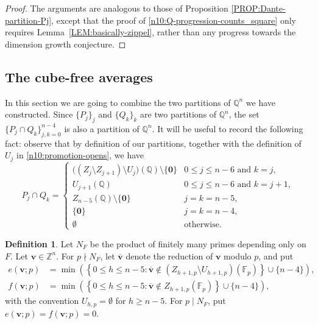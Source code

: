 \documentclass[a4paper,11pt, twoside,reqno]{amsart}
\theoremstyle{plain}
\theoremstyle{definition}
\newtheorem{defin}[thm]{Definition}
\theoremstyle{remark}
\newcommand{\bfv}{\bm{v}}
\newcommand{\ZZ}{\mathbb{Z}}
\newcommand{\QQ}{\mathbb{Q}}
\renewcommand{\bar}{\overline}
\renewcommand{\le}{\leqslant}
\renewcommand{\ge}{\geqslant}
\newcommand{\FF}{\mathbb{F}}
\numberwithin{equation}{section}
\begin{document}
\begin{proof}
The arguments are analogous to those  of Proposition \ref{PROP:Dante-partition-Pj},
except that the proof of \eqref{n10:Q-progression-counts_square} only requires
Lemma~\ref{LEM:basically-zippel}, rather than 
any progress towards the dimension growth conjecture.
\end{proof}

\subsection{The cube-free averages}\label{sec:silver}

In this section we are going to combine the two partitions of $\QQ^n$ we have constructed.
Since $\{P_j\}_j$ and $\{Q_k\}_k$
are two partitions of $\QQ^n$,
the set $\{P_j\cap Q_k\}_{j,k=0}^{n-4}$
is also a partition of $\QQ^n$.
It will be useful to record the following fact:
observe that by definition of our partitions,
together with the definition of $U_j$ in \eqref{n10:promotion-opens},
we have
\begin{equation}
\label{EQ:PjQk-formula}
P_j\cap Q_k=
\begin{cases}
\bigl((Z_j\setminus Z_{j+1})\setminus U_j\bigr)(\QQ)
\setminus\{\boldsymbol{0}\}
& 0\le j\le n-6 \text{ and } k=j,\\[2pt]
U_{j+1}(\QQ)
& 0\le j\le n-6 \text{ and } k=j+1,\\[2pt]
Z_{n-5}(\QQ)\setminus\{\boldsymbol{0}\}
& j=k=n-5,\\[2pt]
\{\boldsymbol{0}\}
& j=k=n-4,\\[2pt]
\emptyset
& \text{otherwise}.
\end{cases}
\end{equation}

\begin{defin}
Let $N_F$ be the product of finitely many primes depending only on $F$.
Let $\bfv\in \ZZ^n$.
For $p\nmid N_F$, let $\bar{\bfv}$ denote the reduction
of $\bfv$ modulo $p$, and put
\[
\begin{aligned}
e(\bfv;p)
&=\min\left(
 \left\{0\le h\le n-5:
 \bar{\bfv}\notin
 (Z_{h+1,p}\setminus U_{h+1,p})(\FF_p)\right\}
 \cup\{n-4\}\right),\\
f(\bfv;p)
&=\min\left(
 \left\{0\le h\le n-5:
 \bar{\bfv}\notin Z_{h+1,p}(\FF_p)\right\}
 \cup\{n-4\}\right),
\end{aligned}
\]
with the convention $U_{h,p}=\emptyset$ for $h\ge n-5$.
For $p\mid N_F$, put $e(\bfv;p)=f(\bfv;p)=0$.
\end{defin}
\end{document}

